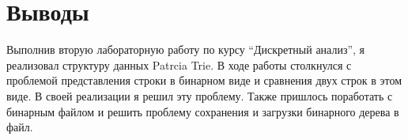 \section{Выводы}
Выполнив вторую лабораторную работу по курсу \enquote{Дискретный анализ}, я реализовал структуру данных Patrcia Trie. В ходе работы
столкнулся с проблемой представления строки в бинарном виде и сравнения двух строк в этом виде. В своей реализации я решил эту проблему.
Также пришлось поработать с бинарным файлом и решить проблему сохранения и загрузки бинарного дерева в файл.
\pagebreak
